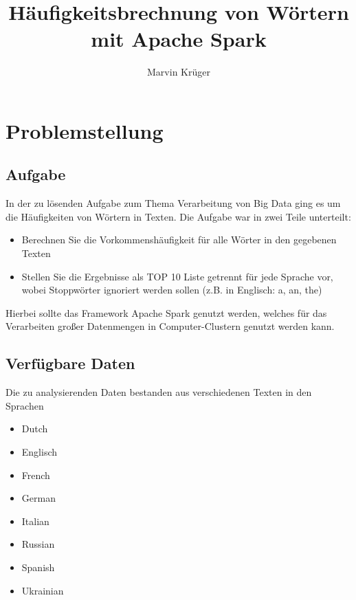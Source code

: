 \documentclass[chapterprefix=true, 12pt, a4paper, oneside, parskip=half, listof=totoc, bibliography=totoc, numbers=noendperiod]{scrbook}
\title{Häufigkeitsbrechnung von Wörtern mit Apache Spark}
\author{Marvin Krüger}
\begin{document}

\maketitle


\tableofcontents \newpage


\chapter{Problemstellung} \label{c:beispiele}

\section{Aufgabe}
In der zu lösenden Aufgabe zum Thema Verarbeitung von Big Data ging es um die Häufigkeiten von Wörtern in Texten. Die Aufgabe war in zwei Teile unterteilt: 
\begin{itemize}
    \item Berechnen Sie die Vorkommenshäufigkeit für alle Wörter in den gegebenen Texten
    \item Stellen Sie die Ergebnisse als TOP 10 Liste getrennt für jede Sprache vor, wobei Stoppwörter ignoriert werden sollen (z.B. in Englisch: a, an, the)
\end{itemize}

Hierbei sollte das Framework Apache Spark genutzt werden, welches für das Verarbeiten großer Datenmengen in Computer-Clustern genutzt werden kann.

\section{Verfügbare Daten}
Die zu analysierenden Daten bestanden aus verschiedenen Texten in den Sprachen
\begin{itemize}
    \item Dutch
    \item Englisch
    \item French
    \item German
    \item Italian
    \item Russian
    \item Spanish
    \item Ukrainian 
\end{itemize}
\end{document}
